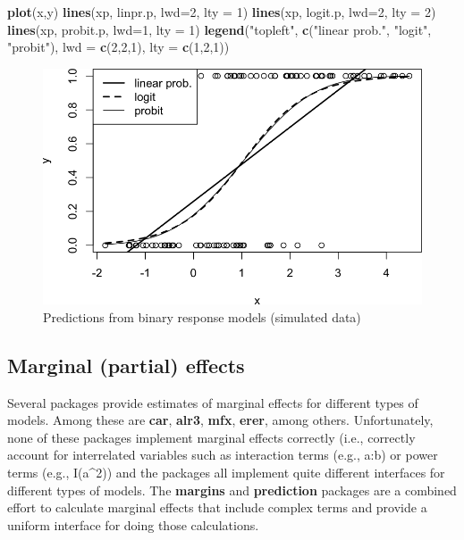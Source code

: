 \documentclass[]{book}
\newenvironment{Shaded}{\begin{snugshade}}{\end{snugshade}}
\newcommand{\DataTypeTok}[1]{\textcolor[rgb]{0.13,0.29,0.53}{#1}}
\newcommand{\DecValTok}[1]{\textcolor[rgb]{0.00,0.00,0.81}{#1}}
\newcommand{\KeywordTok}[1]{\textcolor[rgb]{0.13,0.29,0.53}{\textbf{#1}}}
\newcommand{\NormalTok}[1]{#1}
\newcommand{\StringTok}[1]{\textcolor[rgb]{0.31,0.60,0.02}{#1}}
\begin{document}
\begin{Shaded}
\begin{Highlighting}[]
\KeywordTok{plot}\NormalTok{(x,y)}
\KeywordTok{lines}\NormalTok{(xp, linpr.p, }\DataTypeTok{lwd=}\DecValTok{2}\NormalTok{, }\DataTypeTok{lty =} \DecValTok{1}\NormalTok{)}
\KeywordTok{lines}\NormalTok{(xp, logit.p, }\DataTypeTok{lwd=}\DecValTok{2}\NormalTok{, }\DataTypeTok{lty =} \DecValTok{2}\NormalTok{)}
\KeywordTok{lines}\NormalTok{(xp, probit.p, }\DataTypeTok{lwd=}\DecValTok{1}\NormalTok{, }\DataTypeTok{lty =} \DecValTok{1}\NormalTok{)}
\KeywordTok{legend}\NormalTok{(}\StringTok{"topleft"}\NormalTok{, }
       \KeywordTok{c}\NormalTok{(}\StringTok{"linear prob."}\NormalTok{, }\StringTok{"logit"}\NormalTok{, }\StringTok{"probit"}\NormalTok{), }
       \DataTypeTok{lwd =} \KeywordTok{c}\NormalTok{(}\DecValTok{2}\NormalTok{,}\DecValTok{2}\NormalTok{,}\DecValTok{1}\NormalTok{), }\DataTypeTok{lty =} \KeywordTok{c}\NormalTok{(}\DecValTok{1}\NormalTok{,}\DecValTok{2}\NormalTok{,}\DecValTok{1}\NormalTok{))}
\end{Highlighting}
\end{Shaded}

\begin{figure}

{\centering \includegraphics[width=0.8\linewidth]{MEM5220_R_files/figure-latex/fig22-1} 

}

\caption{Predictions from binary response models (simulated data)}\label{fig:fig22}
\end{figure}

\hypertarget{marginal-partial-effects}{%
\subsection{Marginal (partial) effects}\label{marginal-partial-effects}}

Several packages provide estimates of marginal effects for different types of models. Among these are \textbf{car}, \textbf{alr3}, \textbf{mfx}, \textbf{erer}, among others. Unfortunately, none of these packages implement marginal effects correctly (i.e., correctly account for interrelated variables such as interaction terms (e.g., a:b) or power terms (e.g., I(a\^{}2)) and the packages all implement quite different interfaces for different types of models. The \textbf{margins} and \textbf{prediction} packages are a combined effort to calculate marginal effects that include complex terms and provide a uniform interface for doing those calculations.
\end{document}
